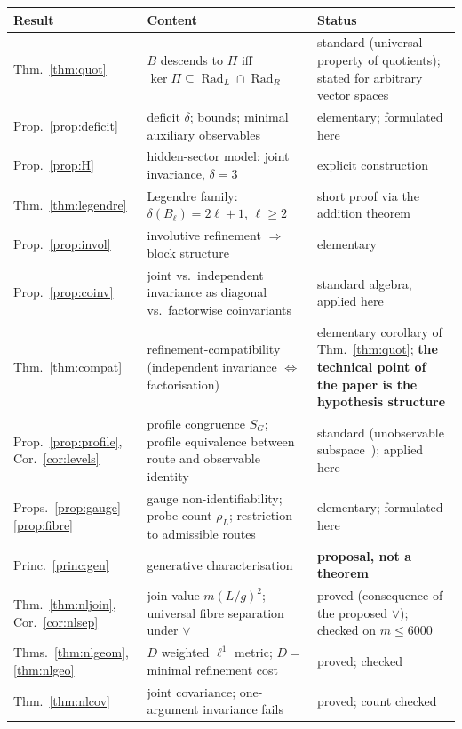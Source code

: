 \documentclass[11pt,a4paper]{article}
\newcommand{\Rad}{\operatorname{Rad}}
\newcommand{\defic}{\delta}
\newcommand{\vj}{\mathbin{\vee}}
\theoremstyle{plain}
\theoremstyle{definition}
\begin{document}
\begin{table}[t]
\centering\small
\begin{tabularx}{\textwidth}{@{}l>{\raggedright\arraybackslash}X>{\raggedright\arraybackslash}p{}@{}}
\toprule
Result & Content & Status\\
\midrule
Thm.~\ref{thm:quot} & $B$ descends to $\Pi$ iff $\ker\Pi\subseteq\Rad_L\cap\Rad_R$ & standard (universal property of quotients); stated for arbitrary vector spaces\\
Prop.~\ref{prop:deficit} & deficit $\defic$; bounds; minimal auxiliary observables & elementary; formulated here\\
Prop.~\ref{prop:H} & hidden-sector model: joint invariance, $\defic=3$ & explicit construction\\
Thm.~\ref{thm:legendre} & Legendre family: $\defic(B_\ell)=2\ell+1$, $\ell\ge2$ & short proof via the addition theorem\\
Prop.~\ref{prop:invol} & involutive refinement $\Rightarrow$ block structure & elementary\\
Prop.~\ref{prop:coinv} & joint vs.\ independent invariance as diagonal vs.\ factorwise coinvariants & standard algebra, applied here\\
Thm.~\ref{thm:compat} & refinement-compatibility (independent invariance $\Leftrightarrow$ factorisation) & elementary corollary of Thm.~\ref{thm:quot}; \textbf{the technical point of the paper is the hypothesis structure}\\
Prop.~\ref{prop:profile}, Cor.~\ref{cor:levels} & profile congruence $S_G$; profile equivalence between route and observable identity & standard (unobservable subspace~\cite{Kal60}); applied here\\
Props.~\ref{prop:gauge}--\ref{prop:fibre} & gauge non-identifiability; probe count $\rho_L$; restriction to admissible routes & elementary; formulated here\\
Princ.~\ref{princ:gen} & generative characterisation & \textbf{proposal, not a theorem}\\
\midrule
Thm.~\ref{thm:nljoin}, Cor.~\ref{cor:nlsep} & join value $m(L/g)^2$; universal fibre separation under $\vj$ & proved (consequence of the proposed $\vj$); checked on $m\le6000$\\
Thms.~\ref{thm:nlgeom}, \ref{thm:nlgeo} & $D$ weighted $\ell^1$ metric; $D=$ minimal refinement cost & proved; checked\\
Thm.~\ref{thm:nlcov} & joint covariance; one-argument invariance fails & proved; count checked\\

\end{tabularx}
\end{table}
\end{document}
